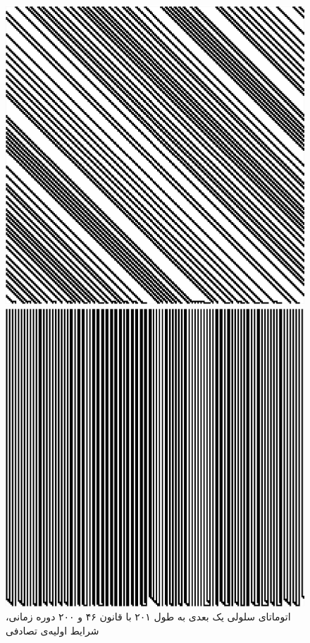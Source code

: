 \documentclass[11pt, a4paper]{article}
\begin{document}
\begin{figure}[!tbp]
  \begin{minipage}[b]{0.3\textwidth}
    \includegraphics[width=\textwidth]{q3-46-rand}
    \caption{اتوماتای سلولی یک بعدی به طول ۲۰۱ با قانون ۴۶ و ۲۰۰ دوره زمانی، شرایط اولیه‌ی تصادفی}
    \label{fig:q3-46-rand}
  \end{minipage}
  \hfill
  \begin{minipage}[b]{0.3\textwidth}
    \includegraphics[width=\textwidth]{q3-78-rand}

\end{minipage}
\end{figure}
\end{document}
